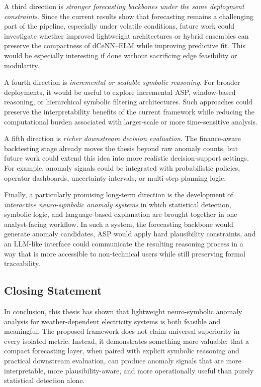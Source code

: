 A third direction is \emph{stronger forecasting backbones under the same deployment constraints}. Since the current results show that forecasting remains a challenging part of the pipeline, especially under volatile conditions, future work could investigate whether improved lightweight architectures or hybrid ensembles can preserve the compactness of dCeNN--ELM while improving predictive fit. This would be especially interesting if done without sacrificing edge feasibility or modularity.

A fourth direction is \emph{incremental or scalable symbolic reasoning}. For broader deployments, it would be useful to explore incremental ASP, window-based reasoning, or hierarchical symbolic filtering architectures. Such approaches could preserve the interpretability benefits of the current framework while reducing the computational burden associated with larger-scale or more time-sensitive analysis.

A fifth direction is \emph{richer downstream decision evaluation}. The finance-aware backtesting stage already moves the thesis beyond raw anomaly counts, but future work could extend this idea into more realistic decision-support settings. For example, anomaly signals could be integrated with probabilistic policies, operator dashboards, uncertainty intervals, or multi-step planning logic.

Finally, a particularly promising long-term direction is the development of \emph{interactive neuro-symbolic anomaly systems} in which statistical detection, symbolic logic, and language-based explanation are brought together in one analyst-facing workflow. In such a system, the forecasting backbone would generate anomaly candidates, ASP would apply hard plausibility constraints, and an LLM-like interface could communicate the resulting reasoning process in a way that is more accessible to non-technical users while still preserving formal traceability.

\subsection{Closing Statement}
\label{subsec:closing_statement}

In conclusion, this thesis has shown that lightweight neuro-symbolic anomaly analysis for weather-dependent electricity systems is both feasible and meaningful. The proposed framework does not claim universal superiority in every isolated metric. Instead, it demonstrates something more valuable: that a compact forecasting layer, when paired with explicit symbolic reasoning and practical downstream evaluation, can produce anomaly signals that are more interpretable, more plausibility-aware, and more operationally useful than purely statistical detection alone.

